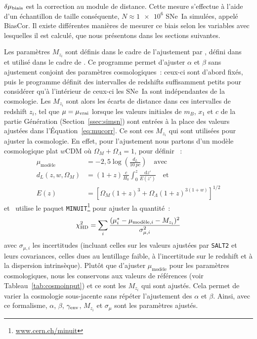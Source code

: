 \documentclass[../main/main.tex]{subfiles}
\begin{document}
$\delta\mu_{\rm biais}$ est la correction au module de distance. Cette mesure
s'effectue à l'aide d'un échantillon de taille conséquente, $N \approx
\num{1e6}$ SNe~Ia simulées, appelé BiasCor. Il existe différentes manières de
mesurer ce biais selon les variables avec lesquelles il est calculé, que nous
présentons dans les sections suivantes.

Les paramètres $M_{z_i}$ sont définis dans le cadre de l'ajustement par \saltmu,
défini dans~\cite{marriner2011} et utilisé dans le cadre de \bbc. Ce programme
permet d'ajuster $\alpha$ et $\beta$ sans ajustement conjoint des paramètres
cosmologiques~: ceux-ci sont d'abord fixés, puis le programme définit des
intervalles de redshifts suffisamment petits pour considérer qu'à l'intérieur de
ceux-ci les SNe~Ia sont indépendantes de la cosmologie. Les $M_{z_i}$ sont alors
les écarts de distance dans ces intervalles de redshift $z_i$, tel que $\mu =
\mu_{\rm vrai}$ lorsque les valeurs initiales de $m_B$, $x_1$ et $c$ de la
partie Génération (Section~\ref{ssec:simsn}) sont entrées à la place des valeurs
ajustées dans l'Équation~\ref{eq:mucorr}. Ce sont ces $M_{z_i}$ qui sont
utilisées pour ajuster la cosmologie. En effet, pour l'ajustement nous partons
d'un modèle cosmologique plat $w$CDM où $\Omega_M + \Omega_{\Lambda} = 1$, pour
définir \citep{kessler2017}~:
\begin{align}\label{eq:mumodel}
    \mu_{\text{modèle}} & = -2,5\log\left(\frac{d_L}{\SI{10}{pc}}\right)
                             \quad\text{avec}\\
    d_L(z,w,\Omega_M)   & = (1+z)
                            \frac{c}{H_0}
                            \int_{0}^{z} \frac{\mathrm{d} z'}{E(z')}
                            \quad\text{et}\\
    E(z)                & = \left[ \Omega_M(1+z)^3
                                 + \Omega_{\Lambda}(1+z)^{3(1+w)}
                             \right]^{1/2}
\end{align}
et \saltmu\ utilise le paquet
\texttt{MINUIT}\footnote{\href{www.cern.ch/minuit}{www.cern.ch/minuit}}
\citep{james1975} pour ajuster la quantité~:
\begin{equation}
    \chi^2_{\rm HD} = \sum_i \frac{
                          (\mu_i^* - \mu_{\text{modèle},i} - M_{z_i})^2}{
                      \sigma_{\mu,i}^2}
\end{equation}
avec $\sigma_{\mu,i}$ les incertitudes (incluant celles sur les valeurs ajustées
par \texttt{SALT2} et leurs covariances, celles dues au lentillage faible, à
l'incertitude sur le redshift et à la dispersion intrinsèque). Plutôt que
d'ajuster $\mu_{\text{modèle}}$ pour les paramètres cosmologiques, nous les
conservons aux valeurs de références (voir Tableau~\ref{tab:cosmoinput}) et ce
sont les $M_{z_i}$ qui sont ajustés. Cela permet de varier la cosmologie
sous-jacente sans répéter l'ajustement des $\alpha$ et $\beta$. Ainsi, avec ce
formalisme, $\alpha$, $\beta$, $\gamma_{\rm env}$, $M_{z_i}$ et $\sigma_{\mu}$
sont les paramètres ajustés.
\end{document}
